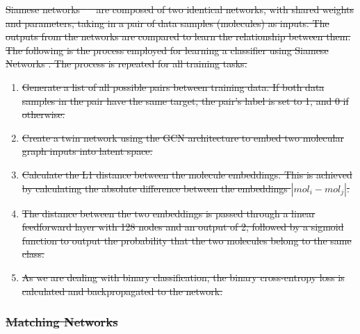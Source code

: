 \documentclass[journal=jcisd8,manuscript=article]{achemso} %
\providecommand{\DIFdel}[1]{{\protect\color{red}\sout{#1}}}                      %
\begin{document}
\DIFdel{Siamese networks \mbox{%
\citep{koch2015siamese} }\hspace{0pt}%
are composed of two identical networks, with shared weights and parameters, taking in a pair of data samples (molecules) as inputs. The outputs from the networks are compared to learn the relationship between them. The following is the process employed for learning a classifier using Siamese Networks . The process is repeated for all training tasks.
}%

\begin{enumerate}%
\item%
\DIFdel{Generate a list of all possible pairs between training data. If both data samples in the pair have the same target, the pair's label is set to 1, and 0 if otherwise.
    }%
\item%
\DIFdel{Create a twin network using the GCN architecture to embed two molecular graph inputs into latent space.
    }%
\item%
\DIFdel{Calculate the L1 distance between the molecule embeddings. This is achieved by calculating the absolute difference between the embeddings $|mol_i-mol_j|$.
    }%
\item%
\DIFdel{The distance between the two embeddings is passed through a linear feedforward layer with 128 nodes and an output of 2, followed by a sigmoid function to output the probability that the two molecules belong to the same class. }%
\item%
\DIFdel{As we are dealing with binary classification, the binary cross-entropy loss is calculated and backpropagated to the network.
}
\end{enumerate}%

\subsubsection{\DIFdel{Matching Networks}}
\addtocounter{subsubsection}{-1}%
\end{document}
